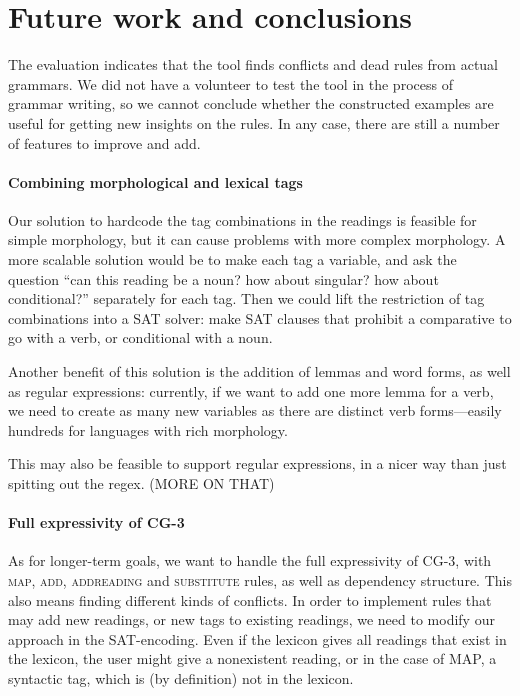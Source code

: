 



\section{Future work and conclusions}
\label{sec:conclusion}

The evaluation indicates that the tool finds conflicts and dead rules
from actual grammars. We did not have a volunteer to test the tool in
the process of grammar writing, so we cannot conclude whether the
constructed examples are useful for getting new insights on the rules.
In any case, there are still a number of features to improve and add.

\paragraph{Combining morphological and lexical tags}

Our solution to hardcode the tag combinations in the readings is
feasible for simple morphology, but it can cause problems with more
complex morphology.
A more scalable solution would be to make each tag a variable, and ask the
question ``can this reading be a noun? how about singular? how about
conditional?'' separately for each tag. Then we could lift the
restriction of tag combinations into a SAT solver: make SAT clauses
that prohibit a comparative to go with a verb, or conditional with a noun.

Another benefit of this solution is the addition of lemmas and word
forms, as well as regular expressions: currently, if we want to add
one more lemma for a verb, we need to create as many new variables as
there are distinct verb forms---easily hundreds for languages with
rich morphology.

This may also be feasible to support regular expressions, in a nicer
way than just spitting out the regex. (MORE ON THAT)

\paragraph{Full expressivity of CG-3}
As for longer-term goals, we want to handle the full expressivity of CG-3,
with \textsc{map}, \textsc{add},  \textsc{addreading} and
\textsc{substitute} rules, as well as dependency structure. 
This also means finding different kinds of conflicts.
In order to implement rules that may add new readings, or new tags to
existing readings, we need to modify our approach in the SAT-encoding.
Even if the lexicon gives all readings that exist in the lexicon, the
user might give a nonexistent reading, or in the case of MAP, a
syntactic tag, which is (by definition) not in the lexicon. 

